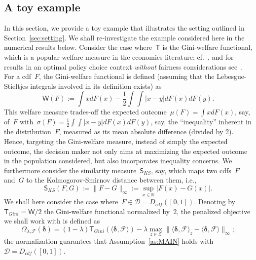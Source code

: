 \documentclass[11pt, a4paper]{article}
\newcommand{\R}{\mathbb{R}}
\theoremstyle{definition}
\begin{document}
\subsection{A toy example}\label{ssec:ex}

In this section, we provide a toy example that illustrates the setting outlined in Section~\ref{sec:setting}. We shall re-investigate the example considered here in the numerical results below. Consider the case where~$\mathsf{T}$ is the Gini-welfare functional, which is a popular welfare measure in the economics literature; cf.~\cite{sen1976}, and for results in an optimal policy choice context \emph{without} fairness considerations see~\cite{kitagawa2019equality}. For a cdf~$F$, the Gini-welfare functional is defined (assuming that the Lebesgue-Stieltjes integrals involved in its definition exists) as 
%
\begin{equation}\label{eqn:giniw}
\mathsf{W}(F) := \int x dF(x) - \frac{1}{2} \int \int |x - y | dF(x)dF(y).
\end{equation}
%
This welfare measure trades-off the expected outcome~$\mu(F) = \int x dF(x)$, say, of~$F$ with~$\sigma(F) = \frac{1}{2} \int \int |x - y | dF(x)dF(y)$, say, the ``inequality'' inherent in the distribution~$F$, measured as its mean absolute difference (divided by 2). Hence, targeting the Gini-welfare measure, instead of simply the expected outcome, the decision maker not only aims at maximizing the expected outcome in the population considered, but also incorporates inequality concerns. We furthermore consider the similarity measure~$\mathsf{S}_{KS}$, say, which maps two cdfs~$F$ and~$G$ to the Kolmogorov-Smirnov distance between them, i.e.,~$$\mathsf{S}_{KS}(F, G) := \|F-G\|_{\infty} := \sup_{x \in \R} |F(x) - G(x)|.$$ We shall here consider the case where~$F \in \mathscr{D} =  D_{cdf}([0, 1])$. Denoting by~$\mathsf{T}_{Gini} = \mathsf{W}/2$ the Gini-welfare functional normalized by~$2$, the penalized objective we shall work with is defined as
%
\begin{equation*}
\Omega_{\lambda, \mathcal{F}}(\bm{\delta}) = (1-\lambda) \mathsf{T}_{Gini} \left(\langle \bm{\delta}, \mathcal{F} \rangle\right) - \lambda  \max_{z \in \mathcal{Z}}  \| \langle \bm{\delta}, \mathcal{F} \rangle_z - \langle \bm{\delta}, \mathcal{F} \rangle \|_{\infty};
\end{equation*}
%
the normalization guarantees that Assumption~\ref{as:MAIN} holds with~$\mathscr{D} = D_{cdf}([0, 1])$. 
\end{document}

